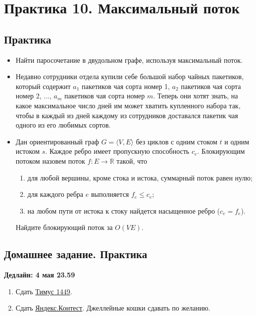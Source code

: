 \section{Практика 10. Максимальный поток}

\subsection{Практика}

\begin{itemize}

  \item Найти паросочетание в двудольном графе, используя максимальный поток.

  \item Недавно сотрудники отдела купили себе большой набор чайных пакетиков, 
который содержит $a_1$ пакетиков чая сорта номер 1, $a_2$ пакетиков чая сорта 
номер 2, ..., $a_m$ пакетиков чая сорта номер $m$. Теперь они хотят знать, на 
какое максимальное число дней им может хватить купленного набора так, чтобы в 
каждый из дней каждому из сотрудников доставался пакетик чая одного из его 
любимых сортов.

  \item Дан ориентированный граф $G = \langle V, E \rangle$ без циклов с 
одним стоком $t$ и одним истоком $s$. Каждое ребро имеет пропускную способность
$c_e$. Блокирующим потоком назовем поток $f : E \rightarrow \mathbb{R}$ такой, 
что
\begin{enumerate}
  \item для любой вершины, кроме стока и истока, суммарный поток равен нулю;
  \item для каждого ребра $e$ выполняется $f_e \leq c_e$;
  \item на любом пути от истока к стоку найдется насыщенное ребро ($c_e = f_e$).
\end{enumerate}
  Найдите блокирующий поток за $O(VE)$.

\end{itemize}

\subsection{Домашнее задание. Практика}
\textbf{Дедлайн: 4 мая 23.59}

\begin{enumerate}

  \item Сдать \href{http://acm.timus.ru/problem.aspx?space=1&num=1449}{Тимус 1449}.

  \item Сдать \href{http://contest2.yandex.ru/contest/511/enter/}{Яндекс.Контест}. 
Джеллейные кошки сдавать по желанию.

\end{enumerate}

